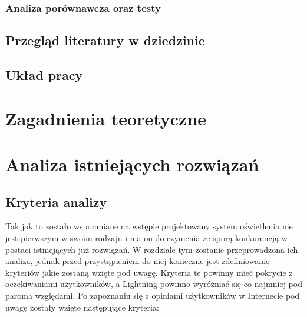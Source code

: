 \documentclass[12pt]{report}
\begin{document}
\subsection{Analiza porównawcza oraz testy}


\section{Przegląd literatury w dziedzinie}


\section{Układ pracy}


\chapter[Zagadnienia teoretyczne]{Zagadnienia teoretyczne}


\chapter[Analiza istniejących rozwiązań]{Analiza istniejących rozwiązań}

\section{Kryteria analizy} \label{kryt}

Tak jak to zostało wspomniane na wstępie projektowany system oświetlenia nie jest pierwszym w swoim rodzaju i ma on do czynienia ze sporą konkurencją w postaci istniejących już rozwiązań. W rozdziale tym zostanie przeprowadzona ich analiza, jednak przed przystąpieniem do niej konieczne jest zdefiniowanie kryteriów jakie zostaną wzięte pod uwagę. Kryteria te powinny mieć pokrycie z oczekiwaniami użytkowników, a Lightning powinno wyróżniać się co najmniej pod paroma względami. Po zapoznaniu się z opiniami użytkowników w Internecie pod uwagę zostały wzięte następujące kryteria:
\end{document}
